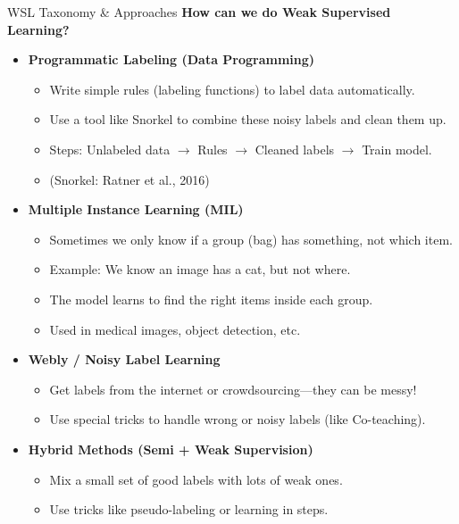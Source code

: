 \begin{frame}[allowframebreaks]{WSL Taxonomy & Approaches}
    \framebreak
    \textbf{How can we do Weak Supervised Learning?}
    \begin{itemize}
        \item \textbf{Programmatic Labeling (Data Programming)}
        \begin{itemize}
            \item Write simple rules (labeling functions) to label data automatically.
            \item Use a tool like Snorkel to combine these noisy labels and clean them up.
            \item Steps: Unlabeled data $\rightarrow$ Rules $\rightarrow$ Cleaned labels $\rightarrow$ Train model.
            \item (Snorkel: Ratner et al., 2016)
        \end{itemize}
        \framebreak
        \item \textbf{Multiple Instance Learning (MIL)}
        \begin{itemize}
            \item Sometimes we only know if a group (bag) has something, not which item.
            \item Example: We know an image has a cat, but not where.
            \item The model learns to find the right items inside each group.
            \item Used in medical images, object detection, etc.
        \end{itemize}
        \framebreak
        \item \textbf{Webly / Noisy Label Learning}
        \begin{itemize}
            \item Get labels from the internet or crowdsourcing—they can be messy!
            \item Use special tricks to handle wrong or noisy labels (like Co-teaching).
        \end{itemize}
        \framebreak
        \item \textbf{Hybrid Methods (Semi + Weak Supervision)}
        \begin{itemize}
            \item Mix a small set of good labels with lots of weak ones.
            \item Use tricks like pseudo-labeling or learning in steps.
        \end{itemize}
    \end{itemize}
\end{frame}
